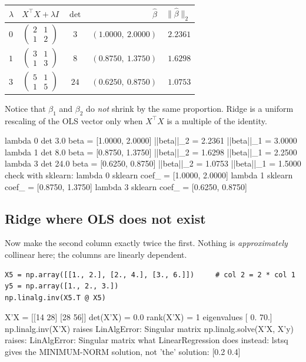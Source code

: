 \documentclass[11pt]{article}
\newcommand{\bhat}{\hat\beta}
\newcommand{\XtX}{X^{\!\top}\!X}
\begin{document}
\begin{worked}
\[\]
\begin{center}
\begin{tabular}{@{}lccrr@{}}
\toprule
$\lambda$ & $\XtX + \lambda I$ & $\det$ & $\bhat$ & $\|\bhat\|_2$\\
\midrule
$0$ & $\left(\begin{smallmatrix}2&1\\1&2\end{smallmatrix}\right)$ & $3$
  & $(1.0000,\ 2.0000)$ & $2.2361$\\[3pt]
$1$ & $\left(\begin{smallmatrix}3&1\\1&3\end{smallmatrix}\right)$ & $8$
  & $(0.8750,\ 1.3750)$ & $1.6298$\\[3pt]
$3$ & $\left(\begin{smallmatrix}5&1\\1&5\end{smallmatrix}\right)$ & $24$
  & $(0.6250,\ 0.8750)$ & $1.0753$\\
\bottomrule
\end{tabular}
\end{center}
Notice that $\beta_1$ and $\beta_2$ do \emph{not} shrink by the same
proportion. Ridge is a uniform rescaling of the OLS vector only when $\XtX$
is a multiple of the identity.
\end{worked}

\begin{codeout}
  lambda 0   det   3.0   beta = [1.0000, 2.0000]   ||beta||_2 = 2.2361   ||beta||_1 = 3.0000
  lambda 1   det   8.0   beta = [0.8750, 1.3750]   ||beta||_2 = 1.6298   ||beta||_1 = 2.2500
  lambda 3   det  24.0   beta = [0.6250, 0.8750]   ||beta||_2 = 1.0753   ||beta||_1 = 1.5000
check with sklearn:
  lambda 0   sklearn coef_ = [1.0000, 2.0000]
  lambda 1   sklearn coef_ = [0.8750, 1.3750]
  lambda 3   sklearn coef_ = [0.6250, 0.8750]
\end{codeout}

\subsection{Ridge where OLS does not exist}
\label{sec:singular}

Now make the second column exactly twice the first. Nothing is
\emph{approximately} collinear here; the columns are linearly dependent.

\begin{lstlisting}
X5 = np.array([[1., 2.], [2., 4.], [3., 6.]])     # col 2 = 2 * col 1
y5 = np.array([1., 2., 3.])
np.linalg.inv(X5.T @ X5)
\end{lstlisting}
\begin{codeout}
X'X =
 [[14 28]
 [28 56]]
det(X'X) = 0.0     rank(X'X) = 1     eigenvalues [ 0. 70.]
np.linalg.inv(X'X) raises LinAlgError: Singular matrix
np.linalg.solve(X'X, X'y) raises: LinAlgError: Singular matrix
what LinearRegression does instead: lstsq gives the MINIMUM-NORM
  solution, not 'the' solution: [0.2 0.4]
\end{codeout}
\end{document}
